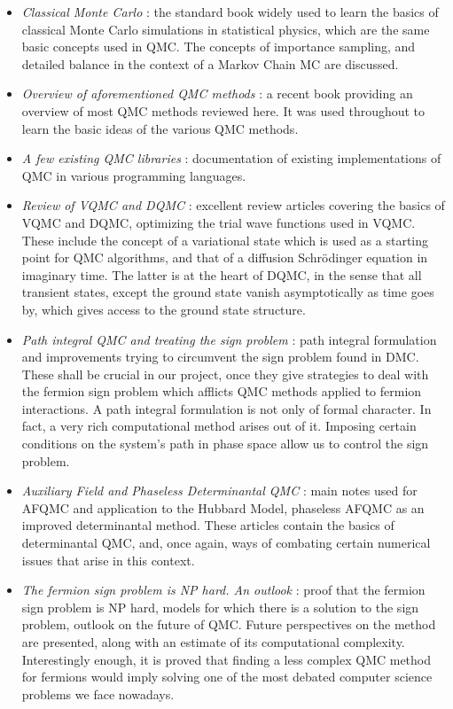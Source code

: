 \documentclass[10pt, twocolumn, twoside]{article}
\begin{document}
\begin{itemize}
\item \emph{Classical Monte Carlo} \cite{newman_barkema} : the  standard book widely used to learn the basics of classical Monte Carlo simulations in statistical physics, which are the same basic concepts used in QMC. The concepts of importance sampling, and detailed balance in the context of a Markov Chain MC are discussed.
\item \emph{Overview of aforementioned QMC methods} \cite{tao} : a recent book providing an overview of most QMC methods reviewed here. It was used throughout to learn the basic ideas of the various QMC methods.
\item \emph{A few existing QMC libraries} \cite{quest,montepython,alps,alf} : documentation of existing implementations of QMC in various programming languages.
\item \emph{Review of VQMC and DQMC} \cite{vmc_review,vmc,umrigar} : excellent review articles covering the basics of VQMC and DQMC, optimizing the trial wave functions used in VQMC. These include the concept of a variational state which is used as a starting point for QMC algorithms, and that of a diffusion Schr\"odinger equation in imaginary time. The latter is at the heart of DQMC, in the sense that all transient states, except the ground state vanish asymptotically as time goes by, which gives access to the ground state structure.
\item \emph{Path integral QMC and treating the sign problem} \cite{arnow,kosztin,constrained,constrained2, springer} : path integral formulation and improvements trying to circumvent the sign problem found in DMC. These shall be crucial in our project, once they give strategies to deal with the fermion sign problem which afflicts QMC methods applied to fermion interactions. A path integral formulation is not only of formal character. In fact, a very rich computational method arises out of it. Imposing certain conditions on the system's path in phase space allow us to control the sign problem.
\item \emph{Auxiliary Field and Phaseless Determinantal QMC} \cite{qmc,zhang,zphase} : main notes used for AFQMC and application to the Hubbard Model, phaseless AFQMC as an improved determinantal method. These articles contain the basics of determinantal QMC, and, once again, ways of combating certain numerical issues that arise in this context. 
\item \emph{The fermion sign problem is NP hard. An outlook} \cite{troyer, wiese,optical, arnow,kalos} : proof that the fermion sign problem is NP hard, models for which there is a solution to the sign problem, outlook on the future of QMC. Future perspectives on the method are presented, along with an estimate of its computational complexity. Interestingly enough, it is proved that finding a less complex QMC method for fermions would imply solving one of the most debated computer science problems we face nowadays.
\end{itemize}
\end{document}
